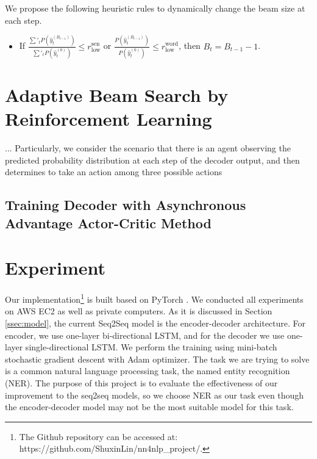 \documentclass[11pt,a4paper]{article}
\begin{document}
We propose the following heuristic rules to dynamically change the beam size at each step.
\begin{itemize}
\item If $\displaystyle{\frac{\sum'_t P(\hat{y}_t^{(B_{t-1})})}{\sum'_t P(\hat{y}_t^{(0)})}} \leq r^{\textrm{sen}}_{\textrm{low}}$ or $\displaystyle{\frac{P(\hat{y}_t^{(B_{t-1})})}{P(\hat{y}_t^{(0)})}} \leq r^{\textrm{word}}_{\textrm{low}}$, then $B_t = B_{t-1} - 1$.
\end{itemize}






\section{Adaptive Beam Search by Reinforcement Learning}
\label{sec:RL}

... Particularly, we consider the scenario that there is an agent observing the predicted probability distribution at each step of the decoder output, and then determines to take an action among three possible actions



\subsection{Training Decoder with Asynchronous Advantage Actor-Critic Method}







\section{Experiment}

Our implementation\footnote{The Github repository can be accessed at: https://github.com/ShuxinLin/nn4nlp\_project/.} is built based on PyTorch \cite{paszke2017automatic}. We conducted all experiments on AWS EC2 as well as private computers. As it is discussed in Section \ref{ssec:model}, the current Seq2Seq model is the encoder-decoder architecture. For encoder, we use one-layer bi-directional LSTM, and for the decoder we use one-layer single-directional LSTM. We perform the training using mini-batch stochastic gradient descent with Adam optimizer. The task we are trying to solve is a common natural language processing task, the named entity recognition (NER). The purpose of this project is to evaluate the effectiveness of our improvement to the seq2seq models, so we choose NER as our task even though the encoder-decoder model may not be the most suitable model for this task.
\end{document}
